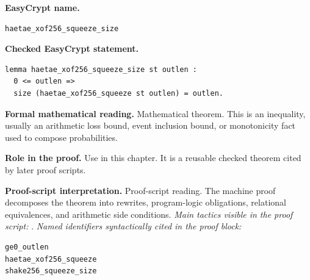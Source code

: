 \begin{formaltheorem}
\noindent\textbf{EasyCrypt name.}
\begin{lstlisting}[language=EasyCrypt,basicstyle=\ttfamily\scriptsize]
haetae_xof256_squeeze_size
\end{lstlisting}
\noindent\textbf{Checked EasyCrypt statement.}
\begin{lstlisting}[language=EasyCrypt,basicstyle=\ttfamily\scriptsize]
lemma haetae_xof256_squeeze_size st outlen :
  0 <= outlen =>
  size (haetae_xof256_squeeze st outlen) = outlen.
\end{lstlisting}
\noindent\textbf{Formal mathematical reading.}
Mathematical theorem. This is an inequality, usually an arithmetic loss bound, event inclusion bound, or monotonicity fact used to compose probabilities.

\noindent\textbf{Role in the proof.}
Use in this chapter. It is a reusable checked theorem cited by later proof scripts.

\noindent\textbf{Proof-script interpretation.}
Proof-script reading. The machine proof decomposes the theorem into rewrites, program-logic obligations, relational equivalences, and arithmetic side conditions.
\emph{Main tactics visible in the proof script:} .
\emph{Named identifiers syntactically cited in the proof block:}
\begin{lstlisting}[language=EasyCrypt,basicstyle=\ttfamily\scriptsize]
ge0_outlen
haetae_xof256_squeeze
shake256_squeeze_size
\end{lstlisting}

\end{formaltheorem}

